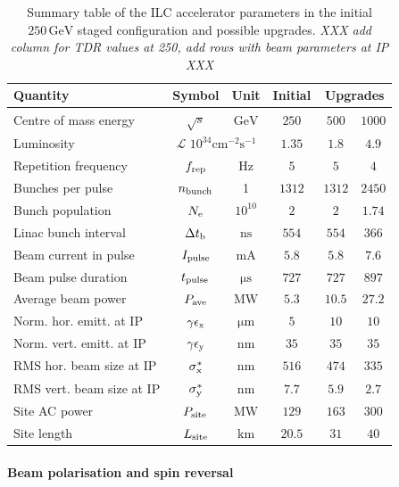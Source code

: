 \begin{table}
\begin{tabular}{lccccc}
Quantity & Symbol & Unit & Initial &  \multicolumn{2}{c}{Upgrades} \\
\hline
Centre of mass energy & $\sqrt{s}$ & ${\mathrm{GeV}}$ & $250$ & $500$ & $1000$ \\
Luminosity & \multicolumn{2}{c}{${\mathcal{L}}$ $10^{34}{\mathrm{cm^{-2}s^{-1}}}$} & $1.35$ & $1.8$ & $4.9$ \\
Repetition frequency &$f_{\mathrm{{rep}}}$ & ${\mathrm{Hz}}$  & $5$ & $5$ & $4$ \\
Bunches per pulse  &$n_{\mathrm{{bunch}}}$ & 1  & $1312$ & $1312$ & $2450$ \\
Bunch population  &$N_{\mathrm{{e}}}$ & $10^{10}$ &$2$ & $2$ & $1.74$ \\
Linac bunch interval & $\Delta t_{\mathrm{{b}}}$ & ${\mathrm{ns}}$ & $554$ & $554$ & $366$ \\
Beam current in pulse & $I_{\mathrm{{pulse}}}$ & ${\mathrm{mA}}$& $5.8$ & $5.8$ & $7.6$  \\
Beam pulse duration  & $t_{\mathrm{{pulse}}}$ & ${\mathrm{\mu s}}$ &$727$ & $727$ & $897$ \\
Average beam power  & $P_{\mathrm{{ave}}}$   & ${\mathrm{MW}}$ & $5.3$   &$10.5$  & $27.2$ \\  
Norm. hor. emitt. at IP & $\gamma\epsilon_{\mathrm{{x}}}$ & ${\mathrm{\mu m}}$& $5$ & $10$ & $10$  \\ 
Norm. vert. emitt. at IP & $\gamma\epsilon_{\mathrm{{y}}}$ & ${\mathrm{nm}}$ & $35$ & $35$ & $35$ \\ 
RMS hor. beam size at IP  & $\sigma^*_{\mathrm{{x}}}$ & ${\mathrm{nm}}$  & $516$ & $474$ & $335$ \\
RMS vert. beam size at IP &$\sigma^*_{\mathrm{{y}}}$ & ${\mathrm{nm}}$ & $7.7$  & $5.9$ & $2.7$ \\
Site AC power  & $P_{\mathrm{{site}}}$ &  ${\mathrm{MW}}$ & $129$ & $163$ & $300$ \\
Site length & $L_{\mathrm{{site}}}$ &  ${\mathrm{km}}$ & $20.5$ & $31$ & $40$ \\
\end{tabular}
\caption{Summary table of the ILC accelerator parameters in the initial $250\,{\mathrm{GeV}}$ staged configuration
and possible upgrades.
{\it XXX add column for TDR values at 250, add rows with beam parameters at IP XXX}
\label{tab:ilc-params}}
\end{table}

\paragraph{Beam polarisation and spin reversal}
\label{par:beampol}


